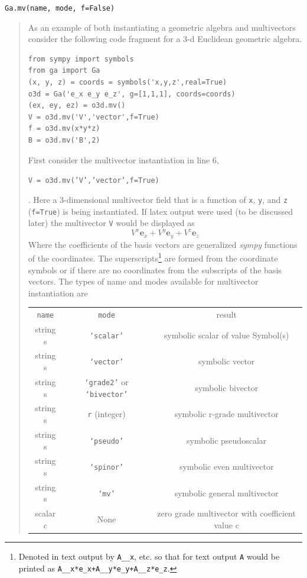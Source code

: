 \documentclass[12pt]{report}
\newcommand{\bm}[1]{\boldsymbol{#1}}
\newcommand{\be}{\begin{equation}}
\newcommand{\ee}{\end{equation}}
\newcommand{\eb}{\bm{e}}
\newcommand{\T}[1]{\texttt{#1}}
\begin{document}
\T{Ga.mv(name, mode, f=False)}
\begin{quote}
As an example of both instantiating a geometric algebra and multivectors consider the
following code fragment for a 3-d Euclidean geometric algebra.
\begin{lstlisting}
from sympy import symbols
from ga import Ga
(x, y, z) = coords = symbols('x,y,z',real=True)
o3d = Ga('e_x e_y e_z', g=[1,1,1], coords=coords)
(ex, ey, ez) = o3d.mv()
V = o3d.mv('V','vector',f=True)
f = o3d.mv(x*y*z)
B = o3d.mv('B',2)
\end{lstlisting}
First consider the multivector instantiation in line 6,\newline
\centerline{\T{V = o3d.mv('V','vector',f=True)}}.\newline
Here
a 3-dimensional multivector field that is a function of \T{x}, \T{y}, and \T{z} (\T{f=True}) is
being instantiated.  If latex output were used (to be discussed later) the multivector
\T{V} would be displayed as
\be
    V^{x}\eb_{x} + V^{y}\eb_{y} + V^{z}\eb_{z}
\ee
Where the coefficients of the basis vectors are generalized \emph{sympy} functions of the
coordinates.  The superscripts\footnote{Denoted in text output by \T{A\_\_x}, etc. so
that for text output \T{A} would be printed as \T{A\_\_x*e\_x+A\_\_y*e\_y+A\_\_z*e\_z}.} are formed
from the coordinate symbols or if there are no coordinates from the subscripts of
the basis vectors.  The types of name and modes available for multivector instantiation are
\begin{center}
   \begin{tabular}{ccc}
    \T{name} &  \T{mode}  &  result \\
         string s &  \T{`scalar'} & symbolic scalar of value Symbol(s) \\
         string s  &\T{`vector'} &  symbolic vector \\
         string s & \T{`grade2'} or \T{`bivector'} & symbolic bivector \\
         string s &  \T{r} (integer) & symbolic r-grade multivector \\
         string s &  \T{`pseudo'} & symbolic pseudoscalar \\
         string s &  \T{`spinor'} & symbolic even multivector \\
         string s &  \T{`mv'} & symbolic general multivector \\
         scalar c & None  &  zero grade multivector with coefficient value c
    \end{tabular}
\end{center}

\end{quote}
\end{document}
